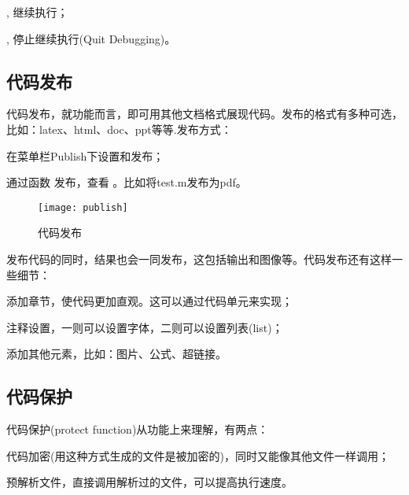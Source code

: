 \begindot
  \item {}, 继续执行；
  \item {}, 停止继续执行(Quit Debugging)。
\myenddot





\subsection{代码发布}

 代码发布，就功能而言，即可用其他文档格式展现代码。发布的格式有多种可选，比如：latex、html、doc、ppt等等.发布方式：

\begindot
  \item 在菜单栏Publish下设置和发布；
  \item 通过函数  发布，查看 。比如将test.m发布为pdf。
\myenddot

\vspace{-0.8cm}


\begin{figure}[htbp]
  \texttt{[image: publish]}
  \caption{代码发布}
\end{figure}

发布代码的同时，结果也会一同发布，这包括输出和图像等。代码发布还有这样一些细节：

\begindot
  \item 添加章节，使代码更加直观。这可以通过代码单元来实现；
  \item 注释设置，一则可以设置字体，二则可以设置列表(list)；
  \item 添加其他元素，比如：图片、公式、超链接。
\myenddot






\subsection{代码保护}

代码保护(protect function)从功能上来理解，有两点：

\begindot
  \item 代码加密(用这种方式生成的文件是被加密的)，同时又能像其他文件一样调用；
  \item 预解析文件，直接调用解析过的文件，可以提高执行速度。
\myenddot

